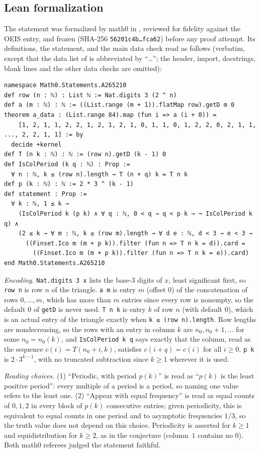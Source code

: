 \documentclass[11pt]{amsart}
\theoremstyle{plain}
\theoremstyle{definition}
\begin{document}
\subsection{Lean formalization}
The statement was formalized by math0 in , reviewed for fidelity against the OEIS entry, and frozen (SHA-256 \texttt{56201c4b\ldots fca62}) before any proof attempt. Its definitions, the statement, and the main data check read as follows (verbatim, except that the data list of  is abbreviated by ``\ldots''; the header, import, docstrings, blank lines and the other data checks are omitted):
\begin{lstlisting}
namespace Math0.Statements.A265210
def row (n : ℕ) : List ℕ := Nat.digits 3 (2 ^ n)
def a (m : ℕ) : ℕ := ((List.range (m + 1)).flatMap row).getD m 0
theorem a_data : (List.range 84).map (fun i => a (i + 0)) =
    [1, 2, 1, 1, 2, 2, 1, 2, 1, 2, 1, 0, 1, 1, 0, 1, 2, 2, 0, 2, 1, 1, ..., 2, 2, 1, 1] := by
  decide +kernel
def T (n k : ℕ) : ℕ := (row n).getD (k - 1) 0
def IsColPeriod (k q : ℕ) : Prop :=
  ∀ n : ℕ, k ≤ (row n).length → T (n + q) k = T n k
def p (k : ℕ) : ℕ := 2 * 3 ^ (k - 1)
def statement : Prop :=
  ∀ k : ℕ, 1 ≤ k →
    (IsColPeriod k (p k) ∧ ∀ q : ℕ, 0 < q → q < p k → ¬ IsColPeriod k q) ∧
    (2 ≤ k → ∀ m : ℕ, k ≤ (row m).length → ∀ d e : ℕ, d < 3 → e < 3 →
      ((Finset.Ico m (m + p k)).filter (fun n => T n k = d)).card =
        ((Finset.Ico m (m + p k)).filter (fun n => T n k = e)).card)
end Math0.Statements.A265210
\end{lstlisting}

\emph{Encoding.} \texttt{Nat.digits 3 x} lists the base-$3$ digits of $x$, least significant first, so \texttt{row n} is row $n$ of the triangle. \texttt{a m} is entry $m$ (offset $0$) of the concatenation of rows $0,\dots,m$, which has more than $m$ entries since every row is nonempty, so the default $0$ of \texttt{getD} is never used. \texttt{T n k} is entry $k$ of row $n$ (with default $0$), which is an actual entry of the triangle exactly when \texttt{k ≤ (row n).length}. Row lengths are nondecreasing, so the rows with an entry in column $k$ are $n_0,n_0+1,\dots$ for some $n_0=n_0(k)$, and \texttt{IsColPeriod k q} says exactly that the column, read as the sequence $c(i)=T(n_0+i,k)$, satisfies $c(i+q)=c(i)$ for all $i\ge0$. \texttt{p k} is $2\cdot3^{k-1}$, with no truncated subtraction since $k\ge1$ wherever it is used.

\emph{Reading choices.} (1) ``Periodic, with period $p(k)$'' is read as ``$p(k)$ is the least positive period'': every multiple of a period is a period, so naming one value refers to the least one. (2) ``Appear with equal frequency'' is read as equal counts of $0,1,2$ in every block of $p(k)$ consecutive entries; given periodicity, this is equivalent to equal counts in one period and to asymptotic frequencies $1/3$, so the truth value does not depend on this choice. Periodicity is asserted for $k\ge1$ and equidistribution for $k\ge2$, as in the conjecture (column~$1$ contains no $0$). Both math0 referees judged the statement faithful.
\end{document}
